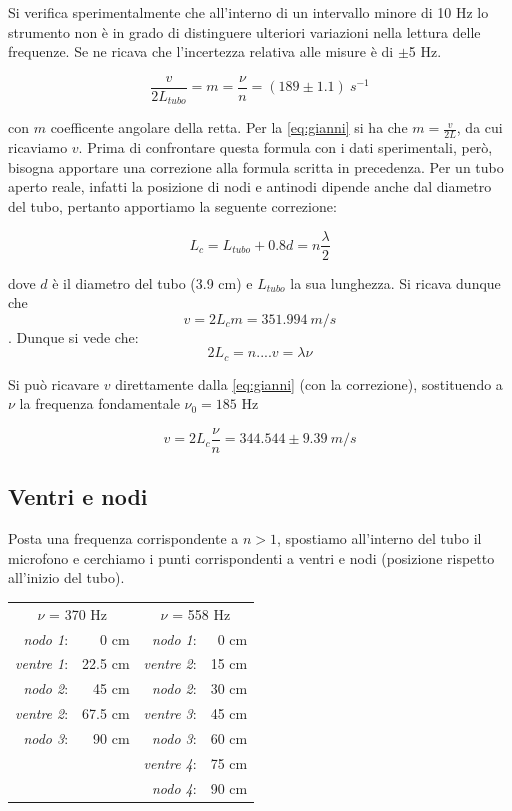 \documentclass[a4paper,10pt]{report}
\begin{document}
Si verifica sperimentalmente che all'interno di un intervallo minore di 10 Hz lo strumento non è in grado di distinguere ulteriori variazioni nella lettura delle frequenze. Se ne ricava che l'incertezza relativa alle misure è di $\pm$5 Hz.

$$ \frac{v}{2L_{tubo}} = m = \frac{\nu}{n} = (189 \pm 1.1)\ s^{-1}$$

con $m$  coefficente angolare della retta. Per la \ref{eq:gianni} si ha che $\displaystyle{m=\frac{v}{2L}}$, da cui ricaviamo $v$. Prima di confrontare questa formula con i dati sperimentali, però, bisogna apportare una correzione alla formula scritta in precedenza. Per un tubo aperto reale, infatti la posizione di nodi e antinodi dipende anche dal diametro del tubo, pertanto apportiamo la seguente correzione:

$$ L_c = L_{tubo}+0.8d = n\frac{\lambda}{2} $$

dove $d$ è il diametro del tubo (3.9 cm) e $L_{tubo}$ la sua lunghezza. 
Si ricava dunque che $$v=2L_cm=351.994\ m/s$$.
Dunque si vede che:
$$ 2L_c= n.... v = \lambda\nu$$

Si può ricavare $v$ direttamente dalla \ref{eq:gianni} (con la correzione), sostituendo a $\nu$ la frequenza fondamentale $\nu_0 = 185$ Hz

$$ v = 2L_c\frac{\nu}{n} = 344.544\pm9.39\ m/s$$ 
   
 
\subsection{Ventri e nodi}

Posta una frequenza corrispondente a $n>1$, spostiamo all'interno del tubo il microfono e cerchiamo i punti corrispondenti a ventri e nodi (posizione rispetto all'inizio del tubo).\\

\begin{center}
\begin{tabular}{r r r r}

\multicolumn{2}{c}{$\nu$ = 370 Hz}&\multicolumn{2}{c}{$\nu$ = 558 Hz}\\
\textit{nodo 1}:& 0 cm & \textit{nodo 1}:& 0 cm\\
\textit{ventre 1}:& 22.5 cm & \textit{ventre 2}:& 15 cm\\
\textit{nodo 2}:& 45 cm &\textit{nodo 2}:& 30 cm\\
\textit{ventre 2}:& 67.5 cm&\textit{ventre 3}:& 45 cm\\
\textit{nodo 3}:& 90 cm & \textit{nodo 3}:& 60 cm\\
& & \textit{ventre 4}:& 75 cm \\
& & \textit{nodo 4}:& 90 cm \\
\end{tabular}
\end{center}
\end{document}
